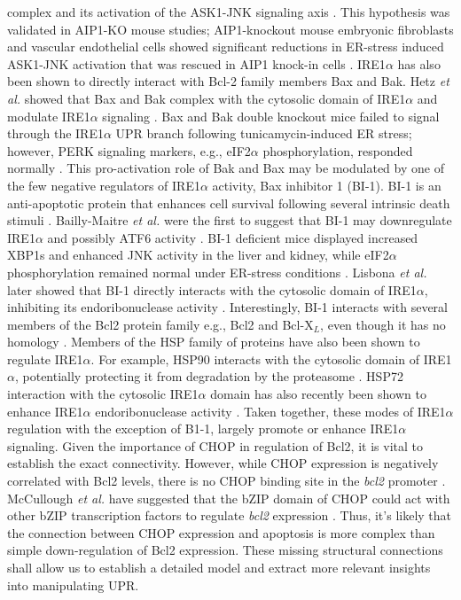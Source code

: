\documentclass[fleqn,10pt]{wlscirep}
\begin{document}
complex and its activation of the ASK1-JNK signaling axis \cite{Luo:2008ly}. This hypothesis was validated in AIP1-KO mouse studies; AIP1-knockout mouse embryonic fibroblasts and vascular endothelial cells showed significant reductions in ER-stress induced ASK1-JNK activation that was rescued in AIP1 knock-in cells \cite{Luo:2008ly}. IRE1$\alpha$ has also been shown to directly interact with Bcl-2 family members Bax and Bak. Hetz \emph{et al.} showed that Bax and Bak complex with the cytosolic domain of IRE1$\alpha$ and modulate IRE1$\alpha$ signaling \cite{Hetz:2006qf}. Bax and Bak double knockout mice failed to signal through the IRE1$\alpha$ UPR branch following tunicamycin-induced ER stress; however, PERK signaling markers, e.g., eIF2$\alpha$ phosphorylation, responded normally \cite{Hetz:2006qf}. This pro-activation role of Bak and Bax may be modulated by one of the few negative regulators of IRE1$\alpha$ activity, Bax inhibitor 1 (BI-1). BI-1 is an anti-apoptotic protein that enhances cell survival following several intrinsic death stimuli \cite{Xu:1998dq}. Bailly-Maitre \emph{et al.} were the first to suggest that BI-1 may downregulate IRE1$\alpha$ and possibly ATF6 activity \cite{Bailly-Maitre:2006bh}. BI-1 deficient mice displayed increased XBP1s and enhanced JNK activity in the liver and kidney, while eIF2$\alpha$ phosphorylation remained normal under ER-stress conditions \cite{Bailly-Maitre:2006bh}. Lisbona \emph{et al.} later showed that BI-1 directly interacts with the cytosolic domain of IRE1$\alpha$, inhibiting its endoribonuclease activity \cite{Lisbona:2009cr}. Interestingly, BI-1 interacts with several members of the Bcl2 protein family e.g., Bcl2 and Bcl-X$_{L}$, even though it has no homology \cite{Xu:1998dq}. Members of the HSP family of proteins have also been shown to regulate IRE1$\alpha$. For example, HSP90 interacts with the cytosolic domain of IRE1$\alpha$, potentially protecting it from degradation by the proteasome \cite{Marcu:2002oq}. HSP72 interaction with the cytosolic IRE1$\alpha$ domain has also recently been shown to enhance IRE1$\alpha$ endoribonuclease activity \cite{Gupta:2010kl}. Taken together, these modes of IRE1$\alpha$ regulation with the exception of B1-1, largely promote or enhance IRE1$\alpha$ signaling. Given the importance of CHOP in regulation of Bcl2, it is vital to establish the exact connectivity. However, while CHOP expression is negatively correlated with Bcl2 levels, there is no CHOP binding site in the \emph{bcl2} promoter \cite{mccullough2001gsc}. McCullough \emph{et al.} have suggested that the bZIP domain of CHOP could act with other bZIP transcription factors to regulate \emph{bcl2} expression \cite{mccullough2001gsc}. Thus, it's likely that the connection between CHOP expression and apoptosis is more complex than simple down-regulation of Bcl2 expression. These missing structural connections shall allow us to establish a detailed model and extract more relevant insights into manipulating UPR. 
\fi
\end{document}
